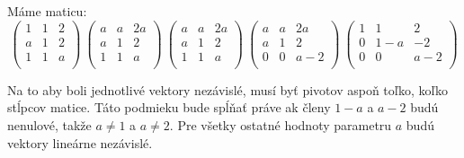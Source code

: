 
Máme maticu:
$$\begin{pmatrix}
    1 & 1 & 2 \\
    a & 1 & 2 \\
    1 & 1 & a \\
\end{pmatrix}
~
\begin{pmatrix}
    a & a & 2a \\
    a & 1 & 2 \\
    1 & 1 & a \\
\end{pmatrix}
~
\begin{pmatrix}
    a & a & 2a \\
    a & 1 & 2 \\
    1 & 1 & a \\
\end{pmatrix}
~
\begin{pmatrix}
    a & a & 2a \\
    a & 1 & 2 \\
    0 & 0 & a-2 \\
\end{pmatrix}
~
\begin{pmatrix}
    1 & 1 & 2 \\
    0 & 1-a & -2 \\
    0 & 0 & a-2 \\
\end{pmatrix}$$

Na to aby boli jednotlivé vektory nezávislé, musí byť pivotov aspoň 
toľko, koľko stĺpcov matice. Táto podmieku bude spĺňať práve ak členy 
$1-a$ a $a-2$ budú nenulové, takže $a\neq 1$ a $a\neq 2$. Pre všetky 
ostatné hodnoty parametru $a$ budú vektory lineárne nezávislé.

